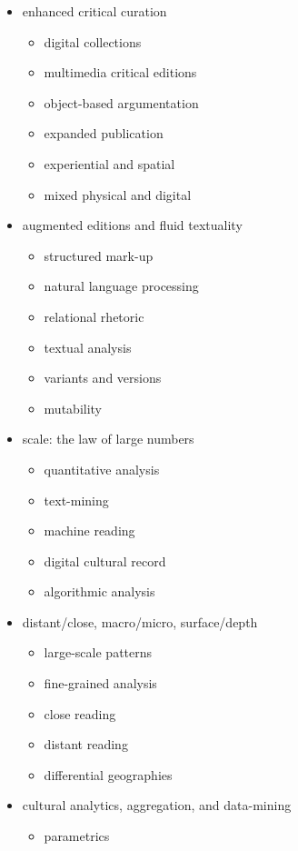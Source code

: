 \begin{itemize}
  \item enhanced critical curation
  \begin{itemize}
    \item digital collections
    \item multimedia critical editions
    \item object-based argumentation
    \item expanded publication
    \item experiential and spatial
    \item mixed physical and digital
  \end{itemize}
  \item augmented editions and fluid textuality
  \begin{itemize}
    \item structured mark-up
    \item	natural language processing
    \item	relational rhetoric
    \item	textual analysis
    \item	variants and versions
    \item	mutability
  \end{itemize}
  \item scale: the law of large numbers
  \begin{itemize}
    \item quantitative analysis
    \item	text-mining
    \item	machine reading
    \item	digital cultural record
    \item	algorithmic analysis
  \end{itemize}
  \item distant/close, macro/micro, surface/depth
  \begin{itemize}
    \item large-scale patterns
    \item	fine-grained analysis
    \item	close reading
    \item	distant reading
    \item	differential geographies
  \end{itemize}
  \item cultural analytics, aggregation, and data-mining
  \begin{itemize}
    \item parametrics

\end{itemize}
\end{itemize}
